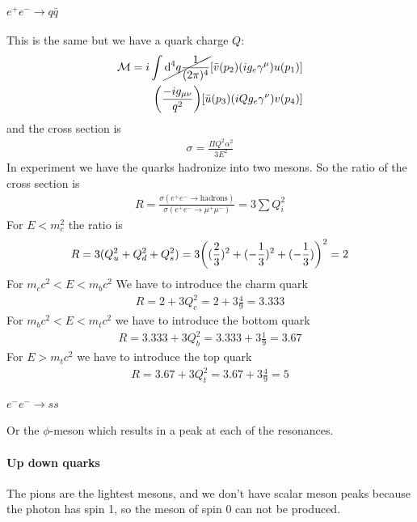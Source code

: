 \documentclass[../main.tex]{subfiles}
\begin{document}
\paragraph*{$e^+ e^- \to q \bar q$}
This is the same but we have a quark charge $Q$:
\begin{align*}
    \mathcal{M} = i \int \cancel{\dd^4{q}\frac{1}{(2\pi)^4}} [\bar v(p_2) (i g_e \gamma^\mu) u(p_1)] \\
    \qt(\frac{-ig_{\mu\nu}}{q^2}) [\bar u(p_3) (i Q g_e \gamma^\nu) v(p_4)] \\
\end{align*}
and the cross section is
\begin{align*}
    \sigma  = \frac{\Pi Q^2 \alpha^2}{3 E^2}
\end{align*}
In experiment we have the quarks hadronize into two mesons. So the ratio of the cross section is
\begin{align*}
    R = \frac{\sigma(e^+ e^- \to \text{hadrons})}{\sigma(e^+ e^- \to \mu^+ \mu^-)} = 3 \sum Q_i^2   
\end{align*}
For $E < m_c^2$ the ratio is
\begin{align*}
    R = 3 (Q_u^2 + Q_d^2 + Q_s^2) = 3 \qt((\frac{2}{3})^2 + (-\frac{1}{3})^2 + (-\frac{1}{3}))^2 = 2
\end{align*}
For $m_c c^2 < E < m_b c^2$ We have to introduce the charm quark
\begin{align*}
    R = 2 + 3 Q_c^2 = 2 + 3 \frac{4}{9} = 3.333
\end{align*}
For $m_b c^2 < E < m_t c^2$ we have to introduce the bottom quark
\begin{align*}
    R = 3.333 + 3 Q_b^2 = 3.333 + 3 \frac{1}{9} = 3.67
\end{align*}
For $E > m_t c^2$ we have to introduce the top quark
\begin{align*}
    R = 3.67 + 3 Q_t^2 = 3.67 + 3 \frac{4}{9} = 5
\end{align*}
\paragraph*{$e^- e^- \to s s$} Or the $\phi$-meson which results in a peak  at each of the 
resonances. 

\paragraph*{Up down quarks} The pions are the lightest mesons, and we don't have scalar meson peaks
because the photon has spin 1, so the meson of spin 0 can not be produced. 
\end{document}
